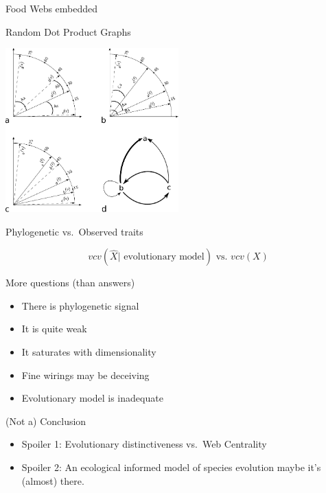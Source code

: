 \documentclass[ignorenonframetext,]{beamer}
\begin{document}
\begin{frame}{Food Webs embedded}

\begin{block}[center]{Random Dot Product Graphs}

\begin{centering}
\includegraphics[width=0.5\textwidth]{images/RDPGmodel.pdf}
\end{centering}

\end{block}

\begin{block}{Phylogenetic vs.~Observed traits}

\begin{equation*}
vcv\left( \hat{X} | \mbox{ evolutionary model} \right) \mbox{ vs. } vcv\left(X\right)
\end{equation*}

\end{block}

\end{frame}

\begin{frame}{More questions (than answers)}

\begin{itemize}[<+->]
\itemsep1pt\parskip0pt
\item
  There is phylogenetic signal
\item
  It is quite weak
\item
  It saturates with dimensionality
\item
  Fine wirings may be deceiving
\item
  Evolutionary model is inadequate
\end{itemize}

\end{frame}

\begin{frame}{(Not a) Conclusion}

\begin{itemize}[<+->]
\item
  Spoiler 1: Evolutionary distinctiveness vs.~Web Centrality
\item
  Spoiler 2: An ecological informed model of species evolution maybe
  it's (almost) there.
\end{itemize}

\end{frame}
\end{document}
